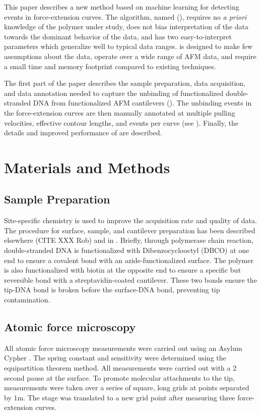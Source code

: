 This paper describes a new method based on machine learning for detecting events in \singlemol{} force-extension curves.  The algorithm, named \name{} (\acronym{}), requires no \textit{a priori} knowledge of the polymer under study, does not bias interpretation of the data towards the dominant behavior of the data, and has two easy-to-interpret parameters which generalize well to typical \singlemol{} data ranges. \name{} is designed to make few assumptions about the data, operate over a wide range of AFM data, and require a small time and memory footprint compared to existing techniques.

 The first part of the paper describes the sample preparation, data acquisition, and data annotation needed to capture the unbinding of functionalized double-stranded DNA from functionalized AFM cantilevers ().  The unbinding events in the force-extension curves are then manually annotated at multiple pulling velocities, effective contour lengths, and events per curve (see ). Finally, the details and improved performance of \name{} are described. 

\chapter{Materials and Methods}

\section{Sample Preparation}

Site-specific chemistry is used to improve the acquisition rate and quality of data. The procedure for surface, sample, and cantilever preparation has been described elsewhere (CITE XXX Rob) and in . Briefly, through polymerase chain reaction, double-stranded DNA is functionalized with Dibenzocyclooctyl (DBCO) at one end to ensure a covalent bond with an azide-functionalized surface. The polymer is also functionalized with biotin at the opposite end to ensure a specific but reversible bond with a streptavidin-coated cantilever. These two bonds ensure the tip-DNA bond is broken before the surface-DNA bond, preventing tip contamination. 

\section{Atomic force microscopy}

All atomic force microscopy measurements were carried out using an Asylum Cypher . The spring constant and sensitivity were determined using the equipartition theorem method. All measurements were carried out with a 2 second pause at the surface. To promote molecular attachments to the tip, measurements were taken over a series of square,  long grids at points separated by 1\textmu{}m. The stage was translated to a new grid point after measuring three force-extension curves. 

